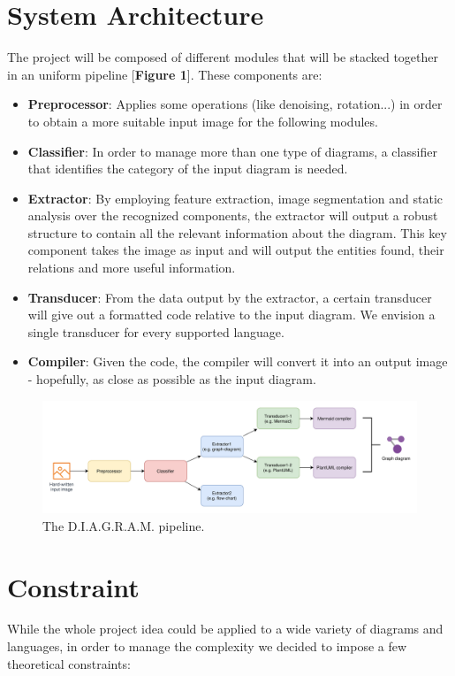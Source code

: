 \documentclass[a4paper,12pt]{article}
\begin{document}
\section{System Architecture}
    The project will be composed of different modules that will be stacked together in an uniform pipeline [\textbf{Figure 1}]. These components are:
    \begin{itemize}
    		\item \textbf{Preprocessor}: Applies some operations (like denoising, rotation...) in order to obtain a more suitable input image for the following modules.
    		\item \textbf{Classifier}: In order to manage more than one type of diagrams, a classifier that identifies the category of the input diagram is needed.
    		\item \textbf{Extractor}: By employing feature extraction, image segmentation and static analysis over the recognized components, the extractor will output a robust structure to contain all the relevant information about the diagram. This key component takes the image as input and will output the entities found, their relations and more useful information.
    		\item \textbf{Transducer}: From the data output by the extractor, a certain transducer will give out a formatted code relative to the input diagram. We envision a single transducer for every supported language.
    		\item \textbf{Compiler}: Given the code, the compiler will convert it into an output image - hopefully, as close as possible as the input diagram.
    \end{itemize}

\begin{figure}[h]
    \centering
    \includegraphics[width=1.2\textwidth]{../assets/images/overview.png} %
    \caption{The D.I.A.G.R.A.M. pipeline.}
\end{figure}

\newpage

\section{Constraint}
While the whole project idea could be applied to a wide variety of diagrams and languages, in order to manage the complexity we decided to impose a few theoretical constraints:
\end{document}
